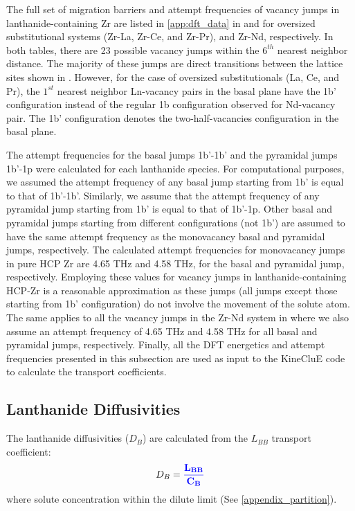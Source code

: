 \documentclass[preprint,12pt]{elsarticle}
\providecommand{\DIFadd}[1]{{\bf #1}} %
\providecommand{\DIFdel}[1]{} %
\providecommand{\DIFaddbegin}{\protect\color{blue}} %
\providecommand{\DIFaddend}{\protect\color{black}} %
\providecommand{\DIFdelbegin}{\protect\color{red}} %
\providecommand{\DIFdelend}{\protect\color{black}} %
\newcommand{\DIFscaledelfig}{0.5}
\newlength{\DIFdelgraphicswidth} %
\newlength{\DIFdelgraphicsheight} %
\newcommand{\DIFaddincludegraphics}[2][]{{\color{blue}\fbox{\DIFOincludegraphics[#1]{#2}}}} %
\newcommand{\DIFdelincludegraphics}[2][]{%
\sbox{\DIFdelgraphicsbox}{\DIFOincludegraphics[#1]{#2}}%
\settoboxwidth{\DIFdelgraphicswidth}{\DIFdelgraphicsbox} %
\settoboxtotalheight{\DIFdelgraphicsheight}{\DIFdelgraphicsbox} %
\scalebox{\DIFscaledelfig}{%
\parbox[b]{\DIFdelgraphicswidth}{\usebox{\DIFdelgraphicsbox}\\[-\baselineskip] \rule{\DIFdelgraphicswidth}{0em}}\llap{\resizebox{\DIFdelgraphicswidth}{\DIFdelgraphicsheight}{%
\setlength{\unitlength}{\DIFdelgraphicswidth}%
\begin{picture}(1,1)%
\thicklines\linethickness{2pt} %
{\color[rgb]{1,0,0}\put(0,0){\framebox(1,1){}}}%
{\color[rgb]{1,0,0}\put(0,0){\line( 1,1){1}}}%
{\color[rgb]{1,0,0}\put(0,1){\line(1,-1){1}}}%
\end{picture}%
}\hspace*{3pt}}} %
} %
\DeclareRobustCommand{\DIFaddbegin}{\DIFOaddbegin \let\includegraphics\DIFaddincludegraphics} %
\DeclareRobustCommand{\DIFaddend}{\DIFOaddend \let\includegraphics\DIFOincludegraphics} %
\DeclareRobustCommand{\DIFdelbegin}{\DIFOdelbegin \let\includegraphics\DIFdelincludegraphics} %
\DeclareRobustCommand{\DIFdelend}{\DIFOaddend \let\includegraphics\DIFOincludegraphics} %
\begin{document}
The full set of migration barriers and attempt frequencies of vacancy jumps in lanthanide-containing Zr are listed in \ref{app:dft_data} in  and  for oversized substitutional systems (Zr-La, Zr-Ce, and Zr-Pr), and Zr-Nd, respectively. In both tables, there are 23 possible vacancy jumps within the $6^{th}$ nearest neighbor distance. The majority of these jumps are direct transitions between the lattice sites shown in . However, for the case of oversized substitutionals (La, Ce, and Pr), the $1^{st}$ nearest neighbor Ln-vacancy pairs in the basal plane have the 1b' configuration instead of the regular 1b configuration observed for \DIFaddbegin \DIFadd{the }\DIFaddend Nd-vacancy pair. The 1b' configuration denotes the two-half-vacancies configuration in the basal plane.


The attempt frequencies for the basal jumps 1b'-1b' and the pyramidal jumps 1b'-1p were calculated for each lanthanide species. For computational purposes, we assumed the attempt frequency of any basal jump starting from 1b' is equal to that of 1b'-1b'. Similarly, we assume that the attempt frequency of any pyramidal jump starting from 1b' is equal to that of 1b'-1p. Other basal and pyramidal jumps starting from different configurations (not 1b') are assumed to have the same attempt frequency as the monovacancy basal and pyramidal jumps, respectively. The calculated attempt frequencies for monovacancy jumps in pure HCP Zr are 4.65 THz and 4.58 THz, for the basal and pyramidal jump, respectively. Employing these values for vacancy jumps in lanthanide-containing HCP-Zr is a reasonable approximation as these jumps (all jumps except those starting from 1b' configuration) do not involve the movement of the solute atom. The same applies to all the vacancy jumps in the Zr-Nd system in  where we also assume an attempt frequency of 4.65 THz and 4.58 THz for all basal and pyramidal jumps, respectively. Finally, all the DFT energetics and attempt frequencies presented in this subsection are used as input to the KineCluE code\cite{schuler_kineclue_2020} to calculate the transport coefficients.

\FloatBarrier

\subsection{Lanthanide Diffusivities}
\label{subsection_diffusivities}

The lanthanide diffusivities ($D_B$) are calculated from the $L_{BB}$ transport coefficient:
\begin{equation}
\DIFaddbegin \label{solute_diffusion_coeff}
    \DIFaddend D_B = \DIFdelbegin \DIFdel{\frac{L_{BB}}{[B]}
}\DIFdelend \DIFaddbegin \DIFadd{\frac{L_{BB}}{C_B}
}\DIFaddend \end{equation}
where \DIFdelbegin \DIFdel{$[B]$ is the }\DIFdelend \DIFaddbegin \DIFadd{$C_B$ is the nominal }\DIFaddend solute concentration within the dilute limit (See \ref{appendix_partition}). 
\DIFdelbegin \DIFdel{Similarly, the }\DIFdelend \DIFaddbegin 
\end{document}
